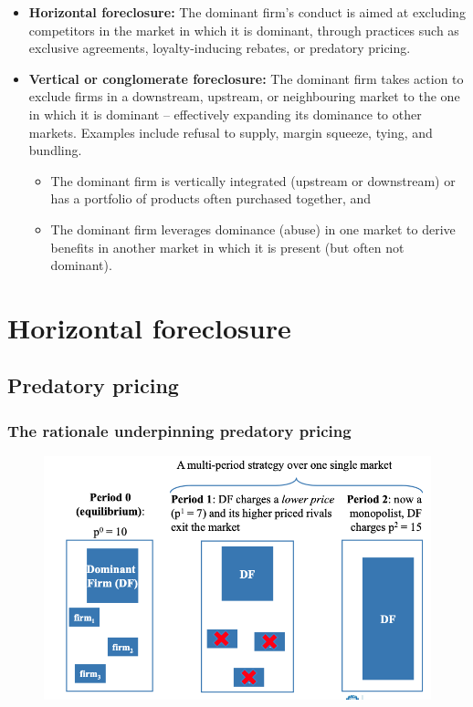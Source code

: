             \begin{itemize}
                \item \textbf{Horizontal foreclosure:} The dominant firm’s conduct is aimed at excluding competitors in the market in which it is dominant, through practices such as exclusive agreements, loyalty-inducing rebates, or predatory pricing.
                \item \textbf{Vertical or conglomerate foreclosure:} The dominant firm takes action to exclude firms in a downstream, upstream, or neighbouring market to the one in which it is dominant – effectively expanding its dominance to other markets. Examples include refusal to supply, margin squeeze, tying, and bundling.
                \begin{itemize}
                    \item The dominant firm is vertically integrated (upstream or downstream) or has a portfolio of products often purchased together, and
                    \item The dominant firm leverages dominance (abuse) in one market to derive benefits in another market in which it is present (but often not dominant).
                \end{itemize}
            \end{itemize}


\section{Horizontal foreclosure}

    \subsection{Predatory pricing}

        \subsubsection{The rationale underpinning predatory pricing}

            \begin{figure}[ht]
                \centering
                \includegraphics[width=0.75\linewidth]{graphics/L7-2.png}
            \end{figure}

